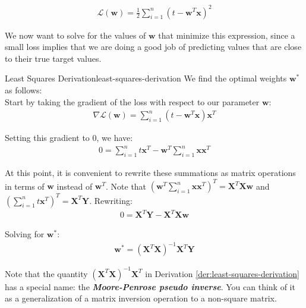 \begin{align}
    \mathcal{L}(\textbf{w}) = \frac{1}{2} \sum_{i=1}^{n} (t - \textbf{w}^{T}\textbf{x})^2
\end{align}


We now want to solve for the values of $\textbf{w}$ that minimize this expression, since a small loss implies that we are doing a good job of predicting values that are close to their true target values.

\begin{derivation}{Least Squares Derivation}{least-squares-derivation}
    We find the optimal weights $\textbf{w}^{*}$ as follows: \\

    Start by taking the gradient of the loss with respect to our parameter $\textbf{w}$:
    \begin{align}
        \nabla \mathcal{L}(\textbf{w}) = \sum_{i=1}^{n} (t - \textbf{w}^{T}\textbf{x})\textbf{x}^{T}
    \end{align}

    Setting this gradient to 0, we have:
    \begin{align}
        0 = \sum_{i=1}^{n} t \textbf{x}^{T} - \textbf{w}^{T} \sum_{i=1}^{n} \textbf{x}\textbf{x}^{T}
    \end{align}

    At this point, it is convenient to rewrite these summations as matrix operations in terms of $\textbf{w}$ instead of $\textbf{w}^{T}$. Note that $(\textbf{w}^{T} \sum_{i=1}^{n} \textbf{x}\textbf{x}^{T})^{T} = \textbf{X}^{T}\textbf{X}\textbf{w}$ and $(\sum_{i=1}^{n} t \textbf{x}^{T})^{T} = \textbf{X}^{T}\textbf{Y}$. Rewriting:
    \begin{align}
        0 = \textbf{X}^{T}\textbf{Y} - \textbf{X}^{T}\textbf{X}\textbf{w}
    \end{align}

    Solving for $\textbf{w}^{*}$:
    \begin{align}
        \textbf{w}^{*} = (\textbf{X}^{T}\textbf{X})^{-1}\textbf{X}^{T}\textbf{Y}
    \end{align}
\end{derivation}

Note that the quantity $(\textbf{X}^{T}\textbf{X})^{-1}\textbf{X}^{T}$ in Derivation \ref{der:least-squares-derivation} has a special name: the \textbf{\textit{Moore-Penrose pseudo inverse}}. You can think of it as a generalization of a matrix inversion operation to a non-square matrix.

